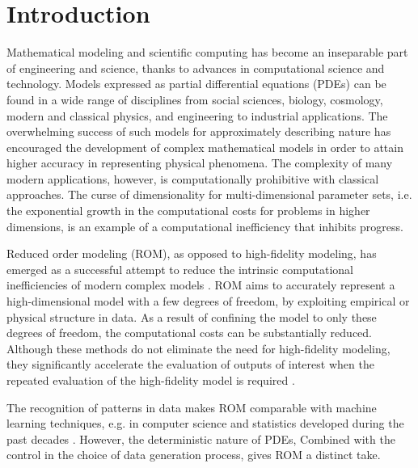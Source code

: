 \chapter{Introduction}
Mathematical modeling and scientific computing has become an inseparable part of engineering and science, thanks to advances in computational science and technology. Models expressed as partial differential equations (PDEs) can be found in a wide range of disciplines from social sciences, biology, cosmology, modern and classical physics, and engineering to industrial applications. The overwhelming success of such models for approximately describing nature has encouraged the development of complex mathematical models in order to attain higher accuracy in representing physical phenomena. The complexity of many modern applications, however, is computationally prohibitive with classical approaches. The curse of dimensionality for multi-dimensional parameter sets, i.e. the exponential growth in the computational costs for problems in higher dimensions, is an example of a computational inefficiency that inhibits progress.

Reduced order modeling (ROM), as opposed to high-fidelity modeling, has emerged as a successful attempt to reduce the intrinsic computational inefficiencies of modern complex models \cite{hesthaven2015certified,quarteroni2015reduced,doi:10.1137/1.9781611974829,doi:10.1137/1.9780898718713}. ROM aims to accurately represent a high-dimensional model with a few degrees of freedom, by exploiting empirical or physical structure in data. As a result of confining the model to only these degrees of freedom, the computational costs can be substantially reduced. Although these methods do not eliminate the need for high-fidelity modeling, they significantly accelerate the evaluation of outputs of interest when the repeated evaluation of the high-fidelity model is required \cite{hesthaven2015certified}.


The recognition of patterns in data makes ROM comparable with machine learning techniques, e.g. in computer science and statistics developed during the past decades \cite{machinelearning}. However, the deterministic nature of PDEs, Combined with the control in the choice of data generation process, gives ROM a distinct take. 

